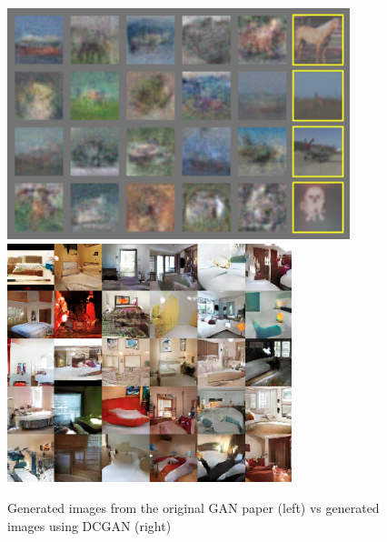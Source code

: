 \begin{figure}[h]
\centering
  \includegraphics[scale=0.4]{chapter_14/files/gan_images.png}
  \includegraphics[scale=0.4]{chapter_14/files/dcgan_bedrooms.png}
  \caption{Generated images from the original GAN paper \cite{goodfellow2014generative} (left) vs generated images using DCGAN (right)\cite{radford2015unsupervised}}
\end{figure}
